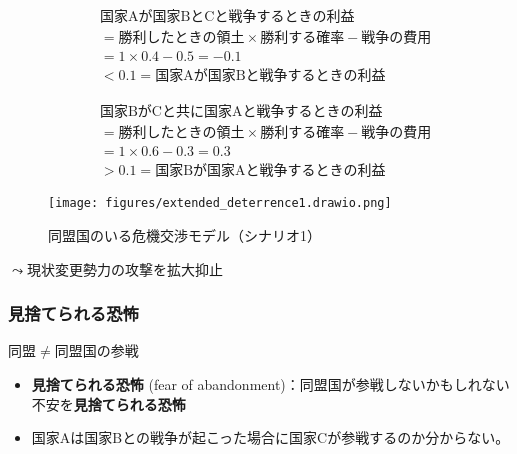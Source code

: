 \documentclass[
  xelatex,
  ja=standard]{bxjsarticle}
\providecommand{\tightlist}{%
  \setlength{\itemsep}{0pt}\setlength{\parskip}{0pt}}\usepackage{longtable,booktabs,array}
\begin{document}
\[
\begin{split}
&\textrm{国家Aが国家BとCと戦争するときの利益} \\
&= \textrm{勝利したときの領土} \times \textrm{勝利する確率} - \textrm{戦争の費用} \\
&= 1 \times 0.4 - 0.5 = -0.1 \\
&< 0.1 = \textrm{国家Aが国家Bと戦争するときの利益}
\end{split}
\]

\[
\begin{split}
&\textrm{国家BがCと共に国家Aと戦争するときの利益} \\
&= \textrm{勝利したときの領土} \times \textrm{勝利する確率} - \textrm{戦争の費用} \\
&= 1 \times 0.6 - 0.3 = 0.3 \\
&> 0.1 = \textrm{国家Bが国家Aと戦争するときの利益}
\end{split}
\]

\begin{figure}[htpb]

{\centering \texttt{[image: figures/extended\_deterrence1.drawio.png]}

}

\caption{同盟国のいる危機交渉モデル（シナリオ1）}

\end{figure}

\(\leadsto\)現状変更勢力の攻撃を拡大抑止

\hypertarget{ux898bux6368ux3066ux3089ux308cux308bux6050ux6016}{%
\subsubsection{見捨てられる恐怖}\label{ux898bux6368ux3066ux3089ux308cux308bux6050ux6016}}

同盟\(\neq\)同盟国の参戦

\begin{itemize}
\tightlist
\item
  \textbf{見捨てられる恐怖} (fear of
  abandonment)：同盟国が参戦しないかもしれない不安を\textbf{見捨てられる恐怖}\citep{snyder1984}
\end{itemize}

\begin{tcolorbox}[enhanced jigsaw, colback=white, leftrule=.75mm, bottomrule=.15mm, opacityback=0, opacitybacktitle=0.6, toptitle=1mm, bottomtitle=1mm, toprule=.15mm, coltitle=black, title=\textcolor{quarto-callout-tip-color}{\faLightbulb}\hspace{0.5em}{同盟国のいる国際危機のシナリオ1'}, titlerule=0mm, colbacktitle=quarto-callout-tip-color!10!white, breakable, arc=.35mm, colframe=quarto-callout-tip-color-frame, rightrule=.15mm, left=2mm]

\begin{itemize}
\tightlist
\item
  国家Aは国家Bとの戦争が起こった場合に国家Cが参戦するのか分からない。
\end{itemize}

\end{tcolorbox}
\end{document}
